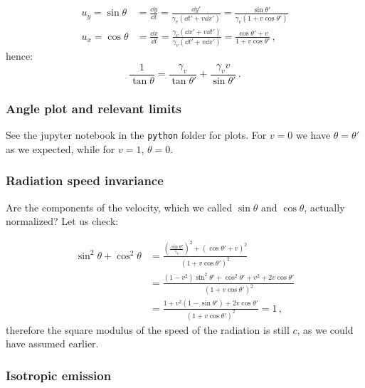 \documentclass[main.tex]{subfiles}
\begin{document}
\begin{subequations}
\begin{align}
    u_y = \sin\theta &= \frac{\dd{y}}{\dd{t}} = \frac{\dd{y'}}{\gamma_v(\dd{t'} + v\dd{x'})} = \frac{\sin\theta'}{\gamma_v(1+v\cos\theta')} \\
    u_x = \cos\theta &= \frac{\dd{x}}{\dd{t}} = \frac{\gamma_v(\dd{x'} + v\dd{t'})}{\gamma_v(\dd{t'} + v\dd{x'})} = \frac{\cos\theta' + v}{1+v\cos\theta'}\,,
\end{align}
\end{subequations}
%
hence:
%
\begin{equation}
\frac{1}{\tan\theta} = \frac{\gamma_v}{\tan\theta'} + \frac{\gamma_vv}{\sin\theta'} \,.
\end{equation}

\subsubsection{Angle plot and relevant limits}
See the jupyter notebook in the \texttt{python} folder for plots.
For $v=0$ we have $\theta=\theta'$ as we expected, while for $v=1$, $\theta = 0$.

\subsubsection{Radiation speed invariance}

Are the components of the velocity, which we called \(\sin \theta\) and \(\cos \theta \), actually normalized? Let us check:

\begin{subequations}
\begin{align}
    \sin^2\theta + \cos^2\theta &= \frac{(\frac{\sin\theta'}{\gamma_v})^2 + (\cos\theta' + v)^2}{(1 + v\cos\theta')^2} \\ 
    &= \frac{(1-v^2)\sin^2\theta' + \cos^2\theta' + v^2 + 2v\cos\theta'}{(1 + v\cos\theta')^2} \\
    &= \frac{1+v^2(1-\sin\theta')+2v\cos\theta'}{(1 + v\cos\theta')^2} = 1 \,,
\end{align}
\end{subequations}
%
therefore the square modulus of the speed of the radiation is still \(c\), as we could have assumed earlier.

\subsubsection{Isotropic emission}
\end{document}
